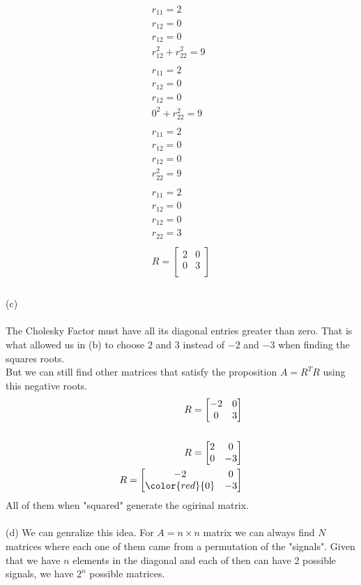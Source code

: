 \documentclass{article}
\begin{document}
	\begin{align*}
		r_{11} = 2\\
		r_{12} = 0\\
		r_{12} = 0\\
		r_{12}^2 + r_{22}^2 = 9\\
\\		
		r_{11} = 2\\
		r_{12} = 0\\
		r_{12} = 0\\
		0^2 + r_{22}^2 = 9\\
		\\
		r_{11} = 2\\
		r_{12} = 0\\
		r_{12} = 0\\
		r_{22}^2 = 9\\
		\\
		r_{11} = 2\\
		r_{12} = 0\\
		r_{12} = 0\\
		r_{22} = 3\\
		\\
		R = \begin{bmatrix}
			2 & 0\\
			0 & 3\\
		\end{bmatrix}\\
	\end{align*}
	\\
	(c)\\
	\\
	The Cholesky Factor must have all its diagonal entries greater than zero. That is what allowed us in (b) to choose $2$ and $3$ instead of $-2$ and $-3$ when finding the squares roots.\\
	But we can still find other matrices that satisfy the proposition $A=R^TR$ using this negative roots.\\
	\begin{align*}
		R = \begin{bmatrix}
		-2 & 0\\
		0 & 3\\
		\end{bmatrix}\\
		\\
		R = \begin{bmatrix}
		2 & 0\\
		0 & -3\\
		\end{bmatrix}\\
		R = \begin{bmatrix}
		-2 & 0\\
		\color{red}{0} & -3\\
		\end{bmatrix}
	\end{align*}
	All of them when "squared" generate the ogirinal matrix.\\
	\\
	(d) We can genralize this idea. For $A= n \times n$ matrix we can always find $N$ matrices where each one of them came from a permutation of the "signals". Given that we have $n$ elements in the diagonal and each of then can have 2 possible signals, we have $2^n$ possible matrices.
\end{document}
